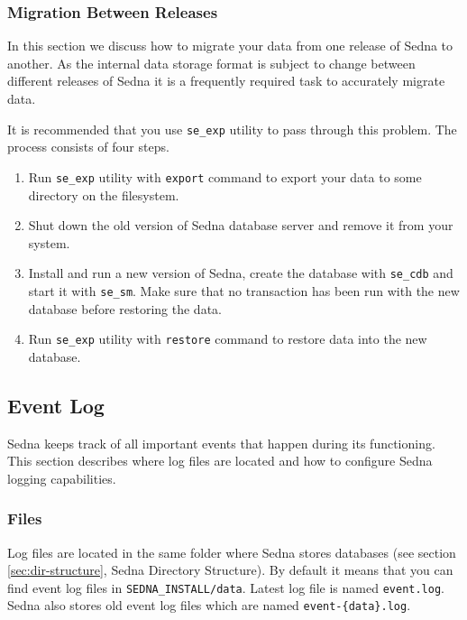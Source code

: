 \documentclass[a4paper,12pt]{article}
\begin{document}
\subsubsection{Migration Between Releases}
\label{sec:release-migr}

In this section we discuss how to migrate your data from one release of Sedna to
another. As the internal data storage format is subject to change between
different releases of Sedna it is a frequently required task to accurately
migrate data.

It is recommended that you use \verb!se_exp! utility to pass through this
problem. The process consists of four steps.

\begin{enumerate}
\item Run \verb!se_exp! utility with \verb!export! command to export your data
to some directory on the filesystem.
\item Shut down the old version of Sedna database server and remove it from your
system.
\item Install and run a new version of Sedna, create the database with
\verb!se_cdb! and start it with \verb!se_sm!. Make sure that no transaction has
been run with the new database before restoring the data.
\item Run \verb!se_exp! utility with \verb!restore! command to restore data into
the new database.
\end{enumerate}

\subsection{Event Log}
\label{sec:event-log}

Sedna keeps track of all important events that happen during its functioning.
This section describes where log files are located and how to configure Sedna
logging capabilities.

\subsubsection{Files}
Log files are located in the same folder where Sedna stores databases (see
section \ref{sec:dir-structure}, Sedna Directory Structure). By default it means
that you can find event log files in \verb!SEDNA_INSTALL/data!. Latest log file
is named \verb!event.log!. Sedna also stores old event log files which are named
\verb!event-{data}.log!.
\end{document}
